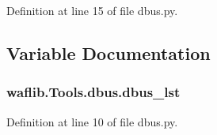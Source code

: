 Definition at line 15 of file dbus.\+py.



\subsection{Variable Documentation}
\subsubsection[{\texorpdfstring{dbus\+\_\+lst}{dbus_lst}}]{\setlength{\rightskip}{0pt plus 5cm}waflib.\+Tools.\+dbus.\+dbus\+\_\+lst}\hypertarget{namespacewaflib_1_1_tools_1_1dbus_a94d07205be12377e99317201fa5601f4}{}\label{namespacewaflib_1_1_tools_1_1dbus_a94d07205be12377e99317201fa5601f4}


Definition at line 10 of file dbus.\+py.

